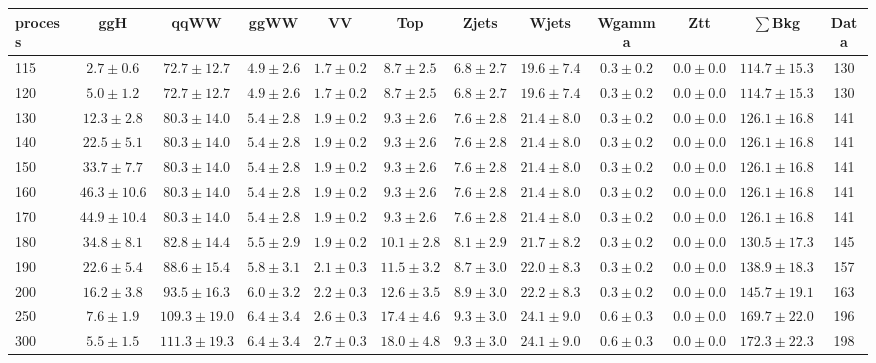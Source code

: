 \begin{table}
{\tiny
 \begin{center}
 \begin{tabular}{l c c c c c c c c c c c }
 \hline
 process & ggH & qqWW & ggWW & VV & Top & Zjets & Wjets & Wgamma & Ztt & $\sum$Bkg & Data \\
 \hline
115 & $2.7\pm0.6$ & $72.7\pm12.7$ & $4.9\pm2.6$ & $1.7\pm0.2$ & $8.7\pm2.5$ & $6.8\pm2.7$ & $19.6\pm7.4$ & $0.3\pm0.2$ & $0.0\pm0.0$ & $114.7\pm15.3$ & 130 \\
120 & $5.0\pm1.2$ & $72.7\pm12.7$ & $4.9\pm2.6$ & $1.7\pm0.2$ & $8.7\pm2.5$ & $6.8\pm2.7$ & $19.6\pm7.4$ & $0.3\pm0.2$ & $0.0\pm0.0$ & $114.7\pm15.3$ & 130 \\
130 & $12.3\pm2.8$ & $80.3\pm14.0$ & $5.4\pm2.8$ & $1.9\pm0.2$ & $9.3\pm2.6$ & $7.6\pm2.8$ & $21.4\pm8.0$ & $0.3\pm0.2$ & $0.0\pm0.0$ & $126.1\pm16.8$ & 141 \\
140 & $22.5\pm5.1$ & $80.3\pm14.0$ & $5.4\pm2.8$ & $1.9\pm0.2$ & $9.3\pm2.6$ & $7.6\pm2.8$ & $21.4\pm8.0$ & $0.3\pm0.2$ & $0.0\pm0.0$ & $126.1\pm16.8$ & 141 \\
150 & $33.7\pm7.7$ & $80.3\pm14.0$ & $5.4\pm2.8$ & $1.9\pm0.2$ & $9.3\pm2.6$ & $7.6\pm2.8$ & $21.4\pm8.0$ & $0.3\pm0.2$ & $0.0\pm0.0$ & $126.1\pm16.8$ & 141 \\
160 & $46.3\pm10.6$ & $80.3\pm14.0$ & $5.4\pm2.8$ & $1.9\pm0.2$ & $9.3\pm2.6$ & $7.6\pm2.8$ & $21.4\pm8.0$ & $0.3\pm0.2$ & $0.0\pm0.0$ & $126.1\pm16.8$ & 141 \\
170 & $44.9\pm10.4$ & $80.3\pm14.0$ & $5.4\pm2.8$ & $1.9\pm0.2$ & $9.3\pm2.6$ & $7.6\pm2.8$ & $21.4\pm8.0$ & $0.3\pm0.2$ & $0.0\pm0.0$ & $126.1\pm16.8$ & 141 \\
180 & $34.8\pm8.1$ & $82.8\pm14.4$ & $5.5\pm2.9$ & $1.9\pm0.2$ & $10.1\pm2.8$ & $8.1\pm2.9$ & $21.7\pm8.2$ & $0.3\pm0.2$ & $0.0\pm0.0$ & $130.5\pm17.3$ & 145 \\
190 & $22.6\pm5.4$ & $88.6\pm15.4$ & $5.8\pm3.1$ & $2.1\pm0.3$ & $11.5\pm3.2$ & $8.7\pm3.0$ & $22.0\pm8.3$ & $0.3\pm0.2$ & $0.0\pm0.0$ & $138.9\pm18.3$ & 157 \\
200 & $16.2\pm3.8$ & $93.5\pm16.3$ & $6.0\pm3.2$ & $2.2\pm0.3$ & $12.6\pm3.5$ & $8.9\pm3.0$ & $22.2\pm8.3$ & $0.3\pm0.2$ & $0.0\pm0.0$ & $145.7\pm19.1$ & 163 \\
250 & $7.6\pm1.9$ & $109.3\pm19.0$ & $6.4\pm3.4$ & $2.6\pm0.3$ & $17.4\pm4.6$ & $9.3\pm3.0$ & $24.1\pm9.0$ & $0.6\pm0.3$ & $0.0\pm0.0$ & $169.7\pm22.0$ & 196 \\
300 & $5.5\pm1.5$ & $111.3\pm19.3$ & $6.4\pm3.4$ & $2.7\pm0.3$ & $18.0\pm4.8$ & $9.3\pm3.0$ & $24.1\pm9.0$ & $0.6\pm0.3$ & $0.0\pm0.0$ & $172.3\pm22.3$ & 198 \\

\end{tabular}
\end{center}}
\end{table}
